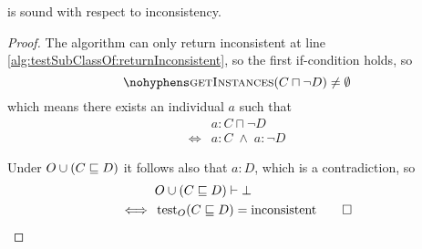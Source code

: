 \documentclass[paper.tex]{subfiles}
\begin{document}
\begin{proposition}
  \label{prop:testSubClassOfInconsistentSound}
   is sound with respect to inconsistency.
\end{proposition}
\begin{proof}
  The algorithm can only return inconsistent at line \ref{alg:testSubClassOf:returnInconsistent}, so the first if-condition holds, so
  \[ \textproc{getInstances}(C \sqcap \neg D) \ne \emptyset \]
  which means there exists an individual $a$ such that
  \begin{align*}
    & a : C \sqcap \neg D \\
    \iff{}& a : C \;\land\; a : \neg D
  \end{align*}

  Under $O \cup (C \sqsubseteq D)$ it follows also that $a : D$, which is a contradiction, so
  \begin{align*}
    & O \cup (C \sqsubseteq D) \vdash \bot \\
    \iff{}& \operatorname{test}_O(C \sqsubseteq D) = \mathrm{inconsistent}
    \qed
  \end{align*}
\end{proof}
\end{document}
